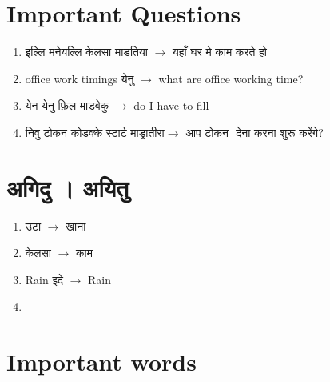 \documentclass{article}
\begin{document}
\section{\s Important Questions  } 
\begin{enumerate}
    \item {\s इल्लि  मनेयल्लि केलसा माडतिया $\longrightarrow$ यहाँ   घर मे काम करते हो }
    \item {\s office work timings येनु $\longrightarrow$ what are office working time?}
    \item {\s  येन येनु फ़िल माडबेकु $\longrightarrow$  do I have to fill}
    \item {\s निवु टोकन  कोडक्के स्टार्ट माड्रातीरा$\longrightarrow$ आप टोकन ​ देना करना शुरू करेंगे?}
\end{enumerate}

\section{\s अगिदु । अयितु } 
\begin{enumerate}
    \item {\s उटा   $\longrightarrow$  खाना }
    \item {\s केलसा   $\longrightarrow$  काम }
    \item {\s Rain   इदे $\longrightarrow$ Rain } 
    \item 

\end{enumerate}


\section{\s Important words } 
\end{document}
